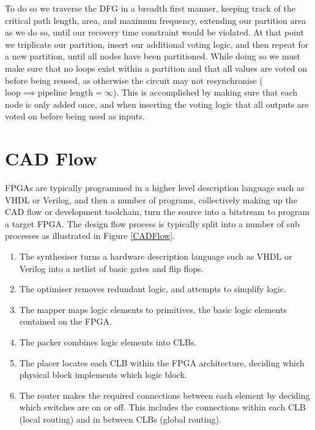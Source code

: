 \documentclass[12pt,drafta4paper,oneside]{memoir} %
\begin{document}
To do so we traverse the \ac{DFG} in a breadth first manner, keeping track of the critical path length, area, and maximum frequency, extending our partition area as we do so, until our recovery time constraint would be violated. At that point we triplicate our partition, insert our additional voting logic, and then repeat for a new partition, until all nodes have been partitioned.  While doing so we must make sure that no loops exist within a partition and that all values are voted on before being reused, as otherwise the circuit may not resynchronise ($\mbox{loop} \implies \mbox{pipeline length} = \infty$). This is accomplished by making sure that each node is only added once, and when inserting the voting logic that all outputs are voted on before being used as inputs.

\section{CAD Flow}
\acp{FPGA} are typically programmed in a higher level description language such as VHDL or Verilog, and then a number of programs, collectively making up the \ac{CAD} flow or development toolchain, turn the source into a bitstream to program a target \ac{FPGA}.
The design flow process is typically split into a number of sub processes as illustrated in Figure \ref{CADFlow}\cite{VPRBook,VPRManual,FPGAArch}.
\begin{enumerate}
    \item The synthesiser turns a hardware description language such as VHDL or Verilog into a netlist of basic gates and flip flops.
    \item The optimiser removes redundant logic, and attempts to simplify logic.
    \item The mapper maps logic elements to primitives, the basic logic elements contained on the \ac{FPGA}.
    \item The packer combines logic elements into \acp{CLB}.
    \item The placer locates each \ac{CLB} within the \ac{FPGA} architecture, deciding which physical block implements which logic block.
    \item The router makes the required connections between each element by deciding which switches are on or off. This includes the connections within each \ac{CLB} (local routing) and in between \acp{CLB} (global routing).
\end{enumerate}
\end{document}
